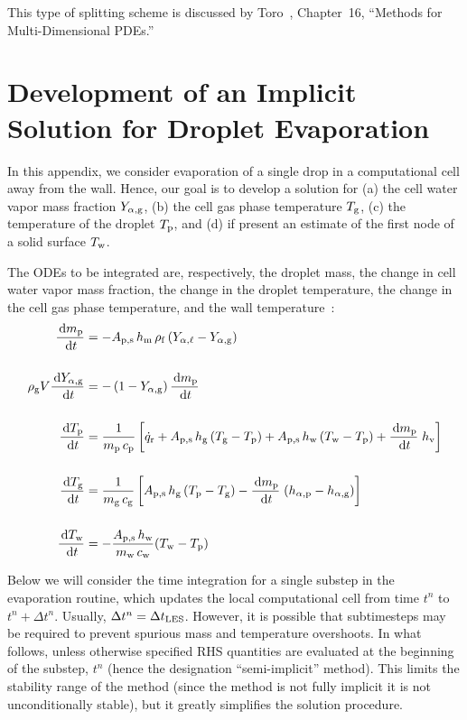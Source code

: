 This type of splitting scheme is discussed by Toro~\cite{Toro}, Chapter~16, ``Methods for Multi-Dimensional PDEs.''


\chapter{Development of an Implicit Solution for Droplet Evaporation}
\label{app_drop_evaporation}

In this appendix, we consider evaporation of a single drop in a computational cell away from the wall.  Hence, our goal is to develop a solution for (a) the cell water vapor mass fraction $Y_{\rm \alpha, g}$, (b) the cell gas phase temperature $T_{\rm g}$, (c) the temperature of the droplet $T_{\rm p}$, and (d) if present an estimate of the first node of a solid surface $T_{\rm w}$.

The ODEs to be integrated are, respectively, the droplet mass, the change in cell water vapor mass fraction, the change in the droplet temperature, the change in the cell gas phase temperature, and the wall temperature~\cite{Cheremisinoff:1}:
\begin{align}
\frac{\,\mathrm{d} m_{\rm p}}{\,\mathrm{d} t} & = - A_{\rm p,s} \, h_{\rm m} \, \rho_{\rm f} \, (Y_{\alpha,\ell} - Y_{\rm \alpha, g}) \label{app_droplet_mass} \\[0.2in]
\rho_{\rm g} V \frac{\,\mathrm{d} Y_{\rm \alpha, g}}{\,\mathrm{d} t} & = -\left(1-Y_{\rm \alpha, g}\right)\frac{\,\mathrm{d} m_{\rm p}}{\,\mathrm{d} t}  \label{app_droplet_gas_fraction} \\[0.2in]
\frac{\,\mathrm{d} T_{\rm p}}{\,\mathrm{d} t} & = \frac{1}{m_{\rm p} \, c_{\rm p}}  \left[ \dot{q}_{\rm r} + A_{\rm p,s} \, h_{\rm g}  \, (T_{\rm g}-T_{\rm p}) + A_{\rm p,s} \, h_{\rm w}  \, (T_{\rm w}-T_{\rm p}) + \frac{\,\mathrm{d} m_{\rm p}}{\,\mathrm{d} t} \; h_{\rm v} \right]  \label{app_droplet_temp}  \\[0.2in]
\frac{\,\mathrm{d} T_{\rm g}}{\,\mathrm{d} t} & = \frac{1}{m_{\rm g} \, c_{\rm g}}  \left[A_{\rm p,s} \, h_{\rm g}  \, (T_{\rm p}-T_{\rm g}) - \frac{\,\mathrm{d} m_{\rm p}}{\,\mathrm{d} t} \; (h_{\rm \alpha,p}-h_{\rm \alpha,g}) \right]  \label{app_droplet_gas_temp}   \\[0.2in]
\frac{\,\mathrm{d} T_{\rm w}}{\,\mathrm{d} t} & = -\frac{A_{\rm p,s} \, h_{\rm w}}{m_{\rm w} \, c_{\rm w}} (T_{\rm w}-T_{\rm p})  \label{app_droplet_solid_temp}
\end{align}

	Below we will consider the time integration for a single substep in the evaporation routine, which updates the local computational cell from time $t^n$ to $t^n + \Delta t^n$.  Usually, $\Delta t^n = \Delta t_{\mathrm{\tiny LES}}$.  However, it is possible that subtimesteps may be required to prevent spurious mass and temperature overshoots.  In what follows, unless otherwise specified RHS quantities are evaluated at the beginning of the substep, $t^n$ (hence the designation ``semi-implicit'' method).  This limits the stability range of the method (since the method is not fully implicit it is not unconditionally stable), but it greatly simplifies the solution procedure.

